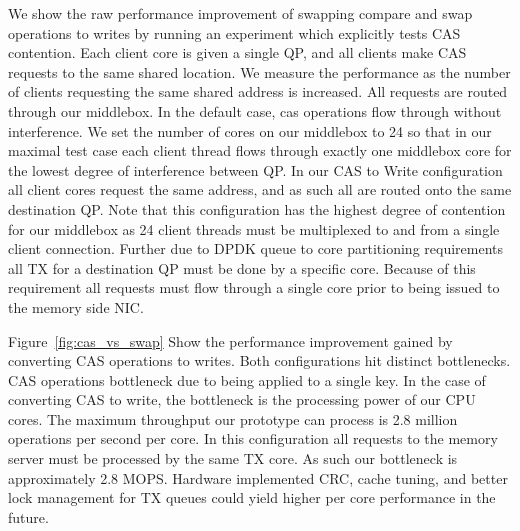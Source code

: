 We show the raw performance improvement of swapping compare and swap operations
to writes by running an experiment which explicitly tests CAS contention. Each
client core is given a single QP, and all clients make CAS requests to the same
shared location. We measure the performance as the number of clients requesting
the same shared address is increased. All requests are routed through our
middlebox. In the default case, cas operations flow through without
interference. We set the number of cores on our middlebox to 24 so that in our
maximal test case each client thread flows through exactly one middlebox core
for the lowest degree of interference between QP. In our CAS to Write
configuration all client cores request the same address, and as such all are
routed onto the same destination QP. Note that this configuration has the
highest degree of contention for our middlebox as 24 client threads must be
multiplexed to and from a single client connection. Further due to DPDK queue to
core partitioning requirements all TX for a destination QP must be done by a
specific core. Because of this requirement all requests must flow through a
single core prior to being issued to the memory side NIC.

Figure~\ref{fig:cas_vs_swap} Show the performance improvement gained by
converting CAS operations to writes. Both configurations hit distinct
bottlenecks. CAS operations bottleneck due to being applied to a single key. In
the case of converting CAS to write, the bottleneck is the processing power of
our CPU cores. The maximum throughput our prototype can process is 2.8 million
operations per second per core. In this configuration all requests to the memory
server must be processed by the same TX core. As such our bottleneck is
approximately 2.8 MOPS. Hardware implemented CRC, cache tuning, and better lock
management for TX queues could yield higher per core performance in the future.



